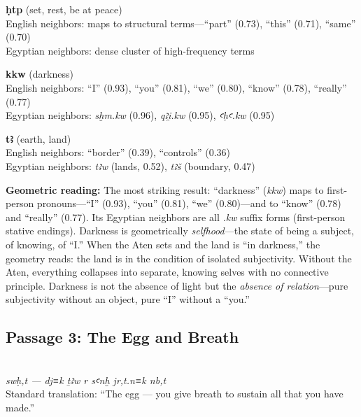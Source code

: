 \documentclass[11pt, a4paper]{article}
\newcommand{\passagehiero}[1]{{\normalfont\hierofont\fontsize{14}{17}\selectfont #1}}
\begin{document}
\bigskip

\noindent\textbf{ḥtp} (set, rest, be at peace)\\
English neighbors: maps to structural terms---``part'' (0.73), ``this'' (0.71), ``same'' (0.70)\\
Egyptian neighbors: dense cluster of high-frequency terms

\medskip

\noindent\textbf{kkw} (darkness)\\
English neighbors: ``I'' (0.93), ``you'' (0.81), ``we'' (0.80), ``know'' (0.78), ``really'' (0.77)\\
Egyptian neighbors: \textit{sḫm.kw} (0.96), \textit{qꜣi̯.kw} (0.95), \textit{ꜥḥꜥ.kw} (0.95)

\medskip

\noindent\textbf{tꜣ} (earth, land)\\
English neighbors: ``border'' (0.39), ``controls'' (0.36)\\
Egyptian neighbors: \textit{tꜣw} (lands, 0.52), \textit{tꜣš} (boundary, 0.47)

\medskip

{\color{insight}\textbf{Geometric reading:}} The most striking result: ``darkness'' (\textit{kkw}) maps to first-person pronouns---``I'' (0.93), ``you'' (0.81), ``we'' (0.80)---and to ``know'' (0.78) and ``really'' (0.77). Its Egyptian neighbors are all \textit{.kw} suffix forms (first-person stative endings). Darkness is geometrically \textit{selfhood}---the state of being a subject, of knowing, of ``I.'' When the Aten sets and the land is ``in darkness,'' the geometry reads: the land is in the condition of isolated subjectivity. Without the Aten, everything collapses into separate, knowing selves with no connective principle. Darkness is not the absence of light but the \textit{absence of relation}---pure subjectivity without an object, pure ``I'' without a ``you.''

\subsection{Passage 3: The Egg and Breath}

{\color{passage}\passagehiero{𓋴𓅱𓎛𓏏𓆇 --- 𓂧𓇋𓎡 𓊡𓅱 𓂋 𓋴𓋹 𓁹𓏏𓈖𓎡 𓎟𓏏}\\\medskip
\textit{\small swḥ,t --- dj≡k ṯꜣw r sꜥnḫ jr,t.n≡k nb,t}\\
Standard translation: ``The egg --- you give breath to sustain all that you have made.''}

\bigskip
\end{document}
